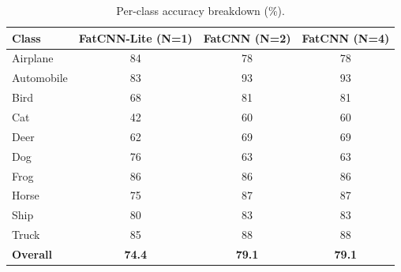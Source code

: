 \begin{table}[htbp]
\centering
\caption{Per-class accuracy breakdown (\%).}
\label{tab:perclass}
\begin{tabular}{lccc}
\toprule
Class & FatCNN-Lite (N=1) & FatCNN (N=2) & FatCNN (N=4) \\
\midrule
Airplane & 84 & 78 & 78 \\
Automobile & 83 & 93 & 93 \\
Bird & 68 & 81 & 81 \\
Cat & 42 & 60 & 60 \\
Deer & 62 & 69 & 69 \\
Dog & 76 & 63 & 63 \\
Frog & 86 & 86 & 86 \\
Horse & 75 & 87 & 87 \\
Ship & 80 & 83 & 83 \\
Truck & 85 & 88 & 88 \\
\midrule
\textbf{Overall} & \textbf{74.4} & \textbf{79.1} & \textbf{79.1} \\
\bottomrule
\end{tabular}
\end{table}
